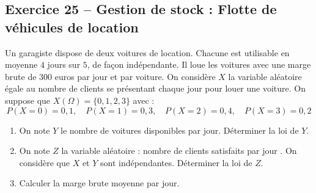 \documentclass[11pt,a4paper]{article}
\begin{document}
\subsection*{Exercice 25 -- Gestion de stock : Flotte de véhicules de location}

Un garagiste dispose de deux voitures de location. Chacune est utilisable en moyenne $4$ jours sur $5$, de façon indépendante. Il loue les voitures avec une marge brute de $300$ euros par jour et par voiture.
On considère $X$ la variable aléatoire égale au nombre de clients se présentant chaque jour pour louer une voiture. On suppose que $X(\Omega) = \{0, 1, 2, 3\}$ avec :
\[
P(X = 0) = 0{,}1, \quad P(X = 1) = 0{,}3, \quad P(X = 2) = 0{,}4, \quad P(X = 3) = 0{,}2
\]
\begin{enumerate}[label=\arabic*.]
    \item On note $Y$ le nombre de voitures disponibles par jour. Déterminer la loi de $Y$.
    \item On note $Z$ la variable aléatoire : \og nombre de clients satisfaits par jour \fg{}. On considère que $X$ et $Y$ sont indépendantes. Déterminer la loi de $Z$.
    \item Calculer la marge brute moyenne par jour.
\end{enumerate}
\end{document}
